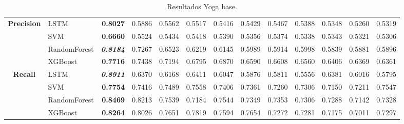 \begin{table}[H]
\begin{adjustbox}{max width=14cm}
\begin{tabular}{|c|l|r|r|r|r|r|r|r|r|r|r|r|}
			\hline
			\textbf{Precision} &  LSTM & \textbf{  0.8027 } &  0.5886 &  0.5562 &  0.5517 &  0.5416 &  0.5429 &  0.5467 &  0.5388 &  0.5348 &  0.5260 &  0.5319 \\
			&  SVM & \textbf{  0.6660 } &  0.5524 &  0.5434 &  0.5418 &  0.5390 &  0.5356 &  0.5374 &  0.5338 &  0.5343 &  0.5321 &  0.5306 \\
			&  RandomForest & \textit{ \textbf{  0.8184 } } &  0.7267 &  0.6523 &  0.6219 &  0.6145 &  0.5989 &  0.5914 &  0.5998 &  0.5839 &  0.5881 &  0.5896 \\
			&  XGBoost & \textbf{  0.7716 } &  0.7438 &  0.7194 &  0.6795 &  0.6870 &  0.6590 &  0.6608 &  0.6560 &  0.6406 &  0.6369 &  0.6361 \\
			\hline
			\textbf{Recall} &  LSTM & \textit{ \textbf{  0.8911 } } &  0.6370 &  0.6168 &  0.6411 &  0.6047 &  0.5876 &  0.5811 &  0.5556 &  0.6381 &  0.6016 &  0.5795 \\
			&  SVM & \textbf{  0.7754 } &  0.7416 &  0.7489 &  0.7558 &  0.7406 &  0.7361 &  0.7260 &  0.7306 &  0.7150 &  0.7211 &  0.7547 \\
			&  RandomForest & \textbf{  0.8469 } &  0.8213 &  0.7539 &  0.7184 &  0.7544 &  0.7349 &  0.7353 &  0.7306 &  0.7288 &  0.7142 &  0.7328 \\
			&  XGBoost & \textbf{  0.8264 } &  0.8026 &  0.7651 &  0.7819 &  0.7594 &  0.7654 &  0.7272 &  0.7281 &  0.7175 &  0.7011 &  0.7297 \\
			\hline
		\end{tabular}
	\end{adjustbox}
	\caption{Resultados Yoga base.}
	\label{tab:Yoga_base}
\end{table}

